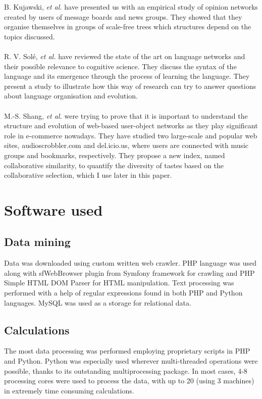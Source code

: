     B. Kujawski, \emph{et al.}\cite{Kujawski2007} have presented us with an empirical study of opinion networks created by users of message boards and news groups. They showed that they organise themselves in groups of scale-free trees which structures depend on the topics discussed.
    \\\\
    R. V. Solé, \emph{et al.}\cite{Sole2010} have reviewed the state of the art on language networks and their possible relevance to cognitive science. They discuss the syntax of the language and its emergence through the process of learning the language. They present a study to illustrate how this way of research can try to answer questions about language organisation and evolution.
    \\\\
    M.-S. Shang, \emph{et al.}\cite{Shang2010} were trying to prove that it is important to understand the structure and evolution of web-based user-object networks as they play significant role in e-commerce nowadays. They have studied two large-scale and popular web sites, audioscrobbler.com and del.icio.us, where users are connected with music groups and bookmarks, respectively. They propose a new index, named collaborative similarity, to quantify the diversity of tastes based on the collaborative selection, which I use later in this paper.

  \section{Software used}
  
    \subsection{Data mining}

      Data was downloaded using custom written web crawler. PHP language was used along with sfWebBrowser plugin from Symfony framework for crawling and PHP Simple HTML DOM Parser for HTML manipulation. Text processing was performed with a help of regular expressions found in both PHP and Python languages. MySQL was used as a storage for relational data.

    \subsection{Calculations}
    
      The most data processing was performed employing proprietary scripts in PHP and Python. Python was especially used wherever multi-threaded operations were possible, thanks to its outstanding multiprocessing package. In most cases, 4-8 processing cores were used to process the data, with up to 20 (using 3 machines) in extremely time consuming calculations.

